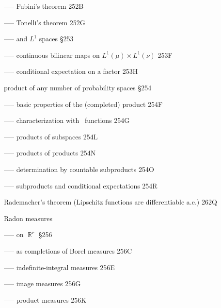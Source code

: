 ----- Fubini's theorem 252B


----- Tonelli's theorem 252G


----- and $L^1$ spaces \S253

----- continuous bilinear maps on $L^1(\mu)\times L^1(\nu)$ 253F


----- conditional expectation on a factor 253H







product of any number of probability spaces \S254

----- basic properties of the (completed) product 254F

----- characterization with \imp\ functions 254G

----- products of subspaces 254L

----- products of products 254N

----- determination by countable subproducts 254O

----- subproducts and conditional expectations 254R



















\indexmedskip





















\indexmedskip

Rademacher's theorem (Lipschitz functions are differentiable a.e.)
262Q


Radon measures


----- on $\BbbR^r$ \S256

----- as completions of Borel measures 256C


----- indefinite-integral measures 256E


----- image measures 256G


----- product measures 256K




















